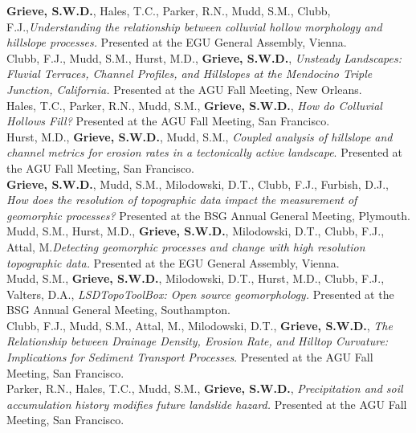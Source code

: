 \documentclass[10pt, a4paper]{article}
\newcommand{\years}[1]{\marginnote{\scriptsize #1}}
\begin{document}
\years{2018}\textbf{Grieve, S.W.D.}, Hales, T.C., Parker, R.N., Mudd, S.M., Clubb, F.J.,\textit{Understanding the relationship between colluvial hollow morphology and hillslope processes.} Presented at the EGU General Assembly, Vienna.\\[0.05cm]

\years{2017}Clubb, F.J., Mudd, S.M., Hurst, M.D., \textbf{Grieve, S.W.D.}, \textit{Unsteady Landscapes: Fluvial Terraces, Channel Profiles, and Hillslopes at the Mendocino Triple Junction, California.} Presented at the AGU Fall Meeting, New Orleans.\\[0.05cm]

\years{2016}Hales, T.C., Parker, R.N., Mudd, S.M., \textbf{Grieve, S.W.D.}, \textit{How do Colluvial Hollows Fill?} Presented at the AGU Fall Meeting, San Francisco.\\[0.05cm]

\years{2016}Hurst, M.D., \textbf{Grieve, S.W.D.}, Mudd, S.M., \textit{Coupled analysis of hillslope and channel metrics for erosion rates in a tectonically active landscape}. Presented at the AGU Fall Meeting, San Francisco.\\[0.05cm]

\years{2016}\textbf{Grieve, S.W.D.}, Mudd, S.M., Milodowski, D.T., Clubb, F.J., Furbish, D.J., \textit{How does the resolution of topographic data impact the measurement of geomorphic processes?} Presented at the BSG Annual General Meeting, Plymouth.\\[0.05cm]

\years{2016}Mudd, S.M., Hurst, M.D., \textbf{Grieve, S.W.D.}, Milodowski, D.T., Clubb, F.J., Attal, M.\textit{Detecting geomorphic processes and change with high resolution topographic data.} Presented at the EGU General Assembly, Vienna.\\[0.05cm]

\years{2015}Mudd, S.M., \textbf{Grieve, S.W.D.}, Milodowski, D.T., Hurst, M.D., Clubb, F.J., Valters, D.A., \textit{LSDTopoToolBox: Open source geomorphology.} Presented at the BSG Annual General Meeting, Southampton.\\[0.05cm]

\years{2015}Clubb, F.J., Mudd, S.M., Attal, M., Milodowski, D.T., \textbf{Grieve, S.W.D.}, \textit{The Relationship between Drainage Density, Erosion Rate, and Hilltop Curvature: Implications for Sediment Transport Processes}. Presented at the AGU Fall Meeting, San Francisco.\\[0.05cm]

\years{2015}Parker, R.N., Hales, T.C., Mudd, S.M., \textbf{Grieve, S.W.D.}, \textit{Precipitation and soil accumulation history modifies future landslide hazard.} Presented at the AGU Fall Meeting, San Francisco.\\[0.05cm]
\end{document}
